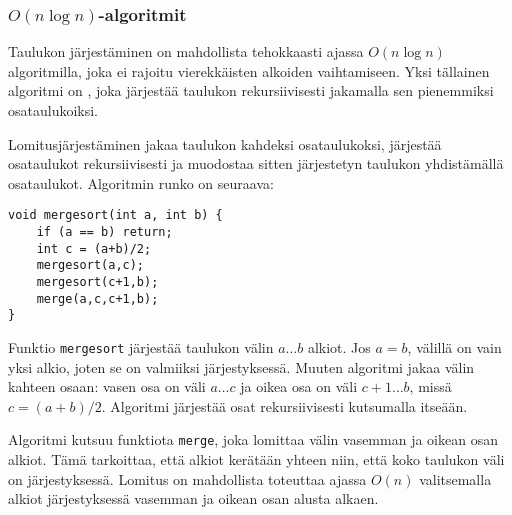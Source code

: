 \subsubsection{$O(n \log n)$-algoritmit}


Taulukon järjestäminen on mahdollista
tehokkaasti ajassa $O(n \log n)$
algoritmilla, joka ei rajoitu vierekkäisten
alkoiden vaihtamiseen.
Yksi tällainen algoritmi on
,
joka järjestää taulukon
rekursiivisesti jakamalla sen
pienemmiksi osataulukoiksi.

Lomitusjärjestäminen
jakaa taulukon kahdeksi osataulukoksi,
järjestää osataulukot rekursiivisesti ja muodostaa
sitten järjestetyn taulukon yhdistämällä osataulukot.
Algoritmin runko on seuraava:
\begin{lstlisting}
void mergesort(int a, int b) {
    if (a == b) return;
    int c = (a+b)/2;
    mergesort(a,c);
    mergesort(c+1,b);
    merge(a,c,c+1,b);
}
\end{lstlisting}

Funktio \texttt{mergesort}
järjestää taulukon välin $a \ldots b$ alkiot.
Jos $a=b$, välillä on vain yksi alkio,
joten se on valmiiksi järjestyksessä.
Muuten algoritmi jakaa välin
kahteen osaan: vasen osa on väli $a \ldots c$
ja oikea osa on väli $c+1 \ldots b$, missä $c=(a+b)/2$.
Algoritmi järjestää osat rekursiivisesti
kutsumalla itseään.

Algoritmi kutsuu funktiota \texttt{merge},
joka lomittaa välin vasemman ja oikean osan alkiot.
Tämä tarkoittaa, että alkiot kerätään yhteen niin,
että koko taulukon väli on järjestyksessä.
Lomitus
on mahdollista toteuttaa ajassa $O(n)$
valitsemalla alkiot järjestyksessä vasemman ja
oikean osan alusta alkaen.

